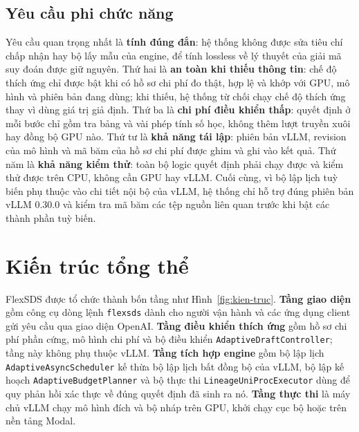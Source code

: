 \subsection{Yêu cầu phi chức năng}

Yêu cầu quan trọng nhất là \textbf{tính đúng đắn}: hệ thống không được sửa tiêu chí chấp nhận hay bộ lấy mẫu của engine, để tính lossless về lý thuyết của giải mã suy đoán được giữ nguyên. Thứ hai là \textbf{an toàn khi thiếu thông tin}: chế độ thích ứng chỉ được bật khi có hồ sơ chi phí đo thật, hợp lệ và khớp với GPU, mô hình và phiên bản đang dùng; khi thiếu, hệ thống từ chối chạy chế độ thích ứng thay vì dùng giá trị giả định. Thứ ba là \textbf{chi phí điều khiển thấp}: quyết định ở mỗi bước chỉ gồm tra bảng và vài phép tính số học, không thêm lượt truyền xuôi hay đồng bộ GPU nào. Thứ tư là \textbf{khả năng tái lập}: phiên bản vLLM, revision của mô hình và mã băm của hồ sơ chi phí được ghim và ghi vào kết quả. Thứ năm là \textbf{khả năng kiểm thử}: toàn bộ logic quyết định phải chạy được và kiểm thử được trên CPU, không cần GPU hay vLLM. Cuối cùng, vì bộ lập lịch tuỳ biến phụ thuộc vào chi tiết nội bộ của vLLM, hệ thống chỉ hỗ trợ đúng phiên bản vLLM 0.30.0 và kiểm tra mã băm các tệp nguồn liên quan trước khi bật các thành phần tuỳ biến.

\section{Kiến trúc tổng thể}
\label{sec:kien-truc}

FlexSDS được tổ chức thành bốn tầng như Hình~\ref{fig:kien-truc}. \textbf{Tầng giao diện} gồm công cụ dòng lệnh \texttt{flexsds} dành cho người vận hành và các ứng dụng client gửi yêu cầu qua giao diện OpenAI. \textbf{Tầng điều khiển thích ứng} gồm hồ sơ chi phí phần cứng, mô hình chi phí và bộ điều khiển \texttt{AdaptiveDraftController}; tầng này không phụ thuộc vLLM. \textbf{Tầng tích hợp engine} gồm bộ lập lịch \texttt{AdaptiveAsyncScheduler} kế thừa bộ lập lịch bất đồng bộ của vLLM, bộ lập kế hoạch \texttt{AdaptiveBudgetPlanner} và bộ thực thi \texttt{LineageUniProcExecutor} dùng để quy phản hồi xác thực về đúng quyết định đã sinh ra nó. \textbf{Tầng thực thi} là máy chủ vLLM chạy mô hình đích và bộ nháp trên GPU, khởi chạy cục bộ hoặc trên nền tảng Modal.

